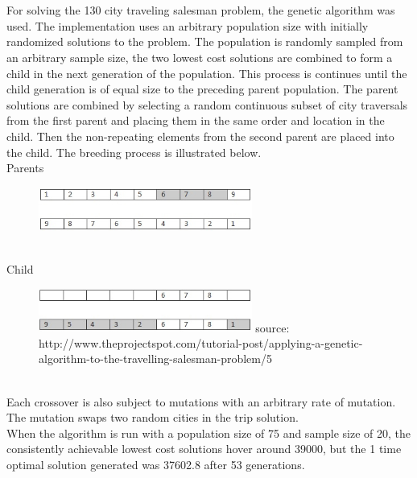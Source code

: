 \documentclass[10pt,a4paper]{article}
\begin{document}
\section{}
For solving the 130 city traveling salesman problem, the genetic algorithm was used. The implementation uses an arbitrary population size with initially randomized solutions to the problem.  The population is randomly sampled from an arbitrary sample size, the two lowest cost solutions are combined to form a child in the next generation of the population. This process is continues until the child generation is of equal size to the preceding parent population.  The parent solutions are combined by selecting a random continuous subset of city traversals from the first parent and placing them in the same order and location in the child. Then the non-repeating elements from the second parent are placed into the child. The breeding process is illustrated below. \\
Parents
\begin{figure}[h]
\includegraphics[width=7cm]{crossover_parents.jpg}
\end{figure}\\
Child
\begin{figure}[h]
\includegraphics[width=7cm]{crossover_children.jpg}
\scriptsize source: http://www.theprojectspot.com/tutorial-post/applying-a-genetic-algorithm-to-the-travelling-salesman-problem/5
\end{figure}
\\
Each crossover is also subject to mutations with an arbitrary rate of mutation. The mutation swaps two random cities in the trip solution.\\
When the algorithm is run with a population size of 75 and sample size of 20, the consistently achievable lowest cost solutions hover around 39000, but the 1 time optimal solution generated was 37602.8 after 53 generations.
\end{document}
